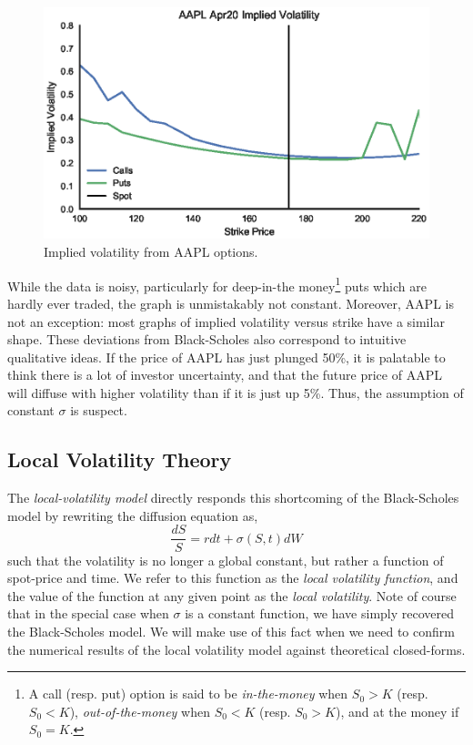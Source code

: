 \documentclass[11pt]{article}
\numberwithin{equation}{section}
\begin{document}
\begin{figure}[h]
\centering
\includegraphics{figs/aapliv}
\caption{Implied volatility from AAPL options.}
\label{fig:aapliv}
\end{figure}

While the data is noisy, particularly for deep-in-the money\footnote{A call
(resp. put) option is said to be \emph{in-the-money} when $S_0 > K$ (resp. $S_0
< K$), \emph{out-of-the-money} when $S_0 < K$ (resp. $S_0 > K$), and at the
money if $S_0 = K$.} puts which are hardly ever traded, the graph is
unmistakably not constant. Moreover, AAPL is not an exception: most graphs of
implied volatility versus strike have a similar shape. These deviations from
Black-Scholes also correspond to intuitive qualitative ideas. If the price of
AAPL has just plunged 50\%, it is palatable to think there is a lot of investor
uncertainty, and that the future price of AAPL will diffuse with higher
volatility than if it is just up 5\%.  Thus, the assumption of constant $\sigma$
is suspect.

\subsection{Local Volatility Theory}
\label{sec:localvoltheory}

The \emph{local-volatility model} directly responds this shortcoming of the
Black-Scholes model by rewriting the diffusion equation as,
\begin{equation}
 \frac{dS}{S} = r dt + \sigma(S,t) dW 
\end{equation}
such that the volatility is no longer a global constant, but rather a function
of spot-price and time. We refer to this function as the \emph{local volatility
function}, and the value of the function at any given point as the \emph{local
volatility}. Note of course that in the special case when $\sigma$ is a constant
function, we have simply recovered the Black-Scholes model. We will make use of
this fact when we need to confirm the numerical results of the local volatility
model against theoretical closed-forms.
\end{document}
